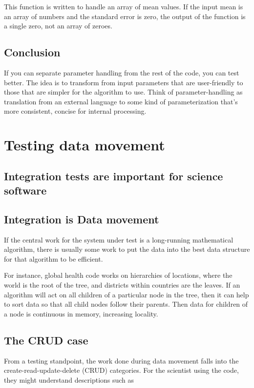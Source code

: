 \documentclass[fleqn,10pt]{olplainarticle}
\begin{document}
This function is written to handle an array of mean values.
If the input mean is an array of numbers and the standard error
is zero, the output of the function is a single zero, not an array
of zeroes.

\subsection{Conclusion}
If you can separate parameter handling from the rest of the code,
you can test better. The idea is to transform from input parameters
that are user-friendly to those that are simpler for the algorithm
to use.
Think of parameter-handling as translation from an external
     language to some kind of parameterization that's more
     consistent, concise for internal processing.


\section{Testing data movement}

\subsection{Integration tests are important for science software}

\subsection{Integration is Data movement}
If the central work for the system under test is a
long-running mathematical algorithm, there is usually some work
to put the data into the best data structure for that algorithm
to be efficient.

For instance, global health code works on
hierarchies of locations, where the world is the root of the
tree, and districts within countries are the leaves. If an algorithm
will act on all children of a particular node in the tree,
then it can help to sort data so that all child nodes follow
their parents. Then data for children of a node is continuous
in memory, increasing locality.

\subsection{The CRUD case}\label{sec:crud}
From a testing standpoint, the work done during data movement
falls into the create-read-update-delete (CRUD) categories.
For the scientist using the code, they might understand
descriptions such as
\end{document}
